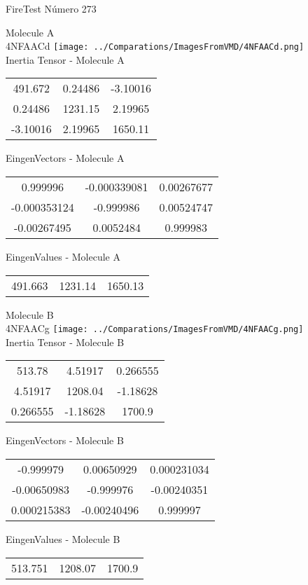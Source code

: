 \vtab[-2cm]
\begin{center}
{\large FireTest \tab Número 273}
\end{center}
\begin{multicols}{2}
\begin{center}

Molecule A \\ 
4NFAACd
\texttt{[image: ../Comparations/ImagesFromVMD/4NFAACd.png]}
\\
Inertia Tensor - Molecule A \\
\vtab

\begin{tabular}{|c c c|}
491.672	 & 	0.24486	 & 	-3.10016	 \\
0.24486	 & 	1231.15	 & 	2.19965	 \\
-3.10016	 & 	2.19965	 & 	1650.11
\end{tabular}

\vtab
 EingenVectors - Molecule A     \\
\vtab
\begin{tabular}{|c c c|}
0.999996	 & 	-0.000339081	 & 	0.00267677	 \\
-0.000353124	 & 	-0.999986	 & 	0.00524747	 \\
-0.00267495	 & 	0.0052484	 & 	0.999983
\end{tabular}

\vtab
 EingenValues - Molecule A     \\
\vtab
\begin{tabular}{|c c c|}
491.663	 & 	1231.14	 & 	1650.13	 \\
\end{tabular}
\columnbreak

Molecule B \\ 
4NFAACg
\texttt{[image: ../Comparations/ImagesFromVMD/4NFAACg.png]}
\\
Inertia Tensor - Molecule B \\
\vtab

\begin{tabular}{|c c c|}
513.78	 & 	4.51917	 & 	0.266555	 \\
4.51917	 & 	1208.04	 & 	-1.18628	 \\
0.266555	 & 	-1.18628	 & 	1700.9
\end{tabular}

\vtab
 EingenVectors - Molecule B     \\
\vtab
\begin{tabular}{|c c c|}
-0.999979	 & 	0.00650929	 & 	0.000231034	 \\
-0.00650983	 & 	-0.999976	 & 	-0.00240351	 \\
0.000215383	 & 	-0.00240496	 & 	0.999997
\end{tabular}

\vtab
 EingenValues - Molecule B     \\
\vtab
\begin{tabular}{|c c c|}
513.751	 & 	1208.07	 & 	1700.9	 \\
\end{tabular}

\end{center}
\end{multicols}
